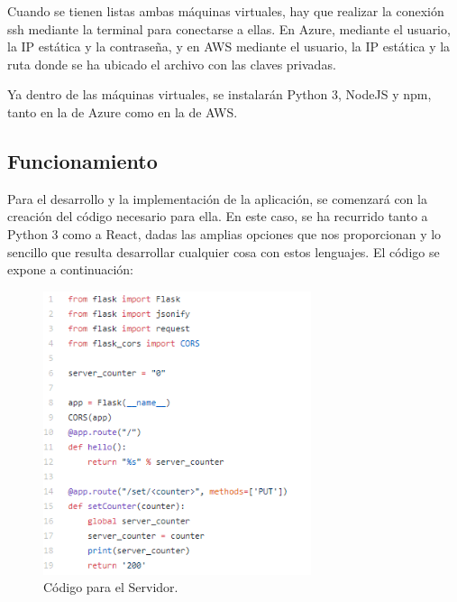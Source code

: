 \documentclass[english,runningheads,a4paper]{llncs}[2018/03/10]
\begin{document}
Cuando se tienen listas ambas máquinas virtuales, hay que realizar la conexión ssh
mediante la terminal para conectarse a ellas. En Azure, mediante el usuario, la IP
estática y la contraseña, y en AWS mediante el usuario, la IP estática y la ruta
donde se ha ubicado el archivo con las claves privadas.

Ya dentro de las máquinas virtuales, se instalarán Python 3, NodeJS y npm, tanto en
la de Azure como en la de AWS.

\subsection{Funcionamiento}

Para el desarrollo y la implementación de la aplicación, se comenzará con la
creación del código necesario para ella. En este caso, se ha recurrido tanto a
Python 3 como a React, dadas las amplias opciones que nos proporcionan y lo
sencillo que resulta desarrollar cualquier cosa con estos lenguajes. El código se
expone a continuación:

\begin{figure}[h!]
 \centering
 \includegraphics[width=0.7\textwidth]{./Web/Azure/CodigoServer.png}
 \caption{Código para el Servidor.}
\end{figure}
\end{document}
